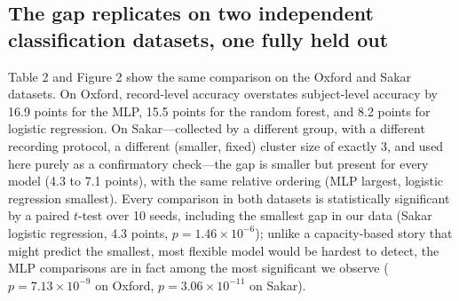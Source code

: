\documentclass[11pt]{article}
\begin{document}
\begin{table}[h]
\centering
\caption{Telemonitoring cluster-size sweep, Pearson correlation (predicted vs.\ true total UPDRS), mean over 5 seeds.}
\end{table}

\subsection{The gap replicates on two independent classification datasets, one fully held out}
Table 2 and Figure 2 show the same comparison on the Oxford and Sakar datasets. On Oxford, record-level accuracy overstates subject-level accuracy by 16.9 points for the MLP, 15.5 points for the random forest, and 8.2 points for logistic regression. On Sakar---collected by a different group, with a different recording protocol, a different (smaller, fixed) cluster size of exactly 3, and used here purely as a confirmatory check---the gap is smaller but present for every model (4.3 to 7.1 points), with the same relative ordering (MLP largest, logistic regression smallest). Every comparison in both datasets is statistically significant by a paired $t$-test over 10 seeds, including the smallest gap in our data (Sakar logistic regression, 4.3 points, $p=1.46\times10^{-6}$); unlike a capacity-based story that might predict the smallest, most flexible model would be hardest to detect, the MLP comparisons are in fact among the most significant we observe ($p=7.13\times10^{-9}$ on Oxford, $p=3.06\times10^{-11}$ on Sakar).
\end{document}
